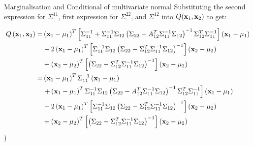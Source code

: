 \documentclass{beamer}
\begin{document}
\begin{frame}{Marginalisation and Conditional of multivariate normal}
	Substituting the second expression for $\Sigma^{11}$, first expression for $\Sigma^{22}$, and $\Sigma^{12}$ into $Q(\mathbf{x}_1,\mathbf{x}_2)$ to get:
	
	\begin{gather}
	\begin{aligned}
	Q\left(\mathbf{x}_{1}, \mathbf{x}_{2}\right)=&\left(\mathbf{x}_{1}-\mu_{1}\right)^{T}\left[\Sigma_{11}^{-1}+\Sigma_{11}^{-1} \Sigma_{12}\left(\Sigma_{22}-A_{12}^{T} \Sigma_{11}^{-1} \Sigma_{12}\right)^{-1} \Sigma_{12}^{T} \Sigma_{11}^{-1}\right]\left(\mathbf{x}_{1}-\mu_{1}\right) \\
	&-2\left(\mathbf{x}_{1}-\mu_{1}\right)^{T}\left[\Sigma_{11}^{-1} \Sigma_{12}\left(\Sigma_{22}-\Sigma_{12}^{T} \Sigma_{11}^{-1} \Sigma_{12}\right)^{-1}\right]\left(\mathbf{x}_{2}-\mu_{2}\right) \\
	&+\left(\mathbf{x}_{2}-\mu_{2}\right)^{T}\left[\left(\Sigma_{22}-\Sigma_{12}^{T} \Sigma_{11}^{-1} \Sigma_{12}\right)^{-1}\right]\left(\mathbf{x}_{2}-\mu_{2}\right)\\
	=&\left(\mathbf{x}_{1}-\mu_{1}\right)^{T} \Sigma_{11}^{-1}\left(\mathbf{x}_{1}-\mu_{1}\right) \\
	&\left.+\left(\mathbf{x}_{1}-\mu_{1}\right)^{T} \Sigma_{11}^{-1} \Sigma_{12}\left(\Sigma_{22}-A_{12}^{T} \Sigma_{11}^{-1} \Sigma_{12}\right)^{-1} \Sigma_{12}^{T} \Sigma_{11}^{-1}\right]\left(\mathbf{x}_{1}-\mu_{1}\right) \\
	&-2\left(\mathbf{x}_{1}-\mu_{1}\right)^{T}\left[\Sigma_{11}^{-1} \Sigma_{12}\left(\Sigma_{22}-\Sigma_{12}^{T} \Sigma_{11}^{-1} \Sigma_{12}\right)^{-1}\right]\left(\mathbf{x}_{2}-\mu_{2}\right) \\
	&+\left(\mathbf{x}_{2}-\mu_{2}\right)^{T}\left[\left(\Sigma_{22}-\Sigma_{12}^{T} \Sigma_{11}^{-1} \Sigma_{12}\right)^{-1}\right]\left(\mathbf{x}_{2}-\mu_{2}\right)
	\end{aligned}\\
	\end{gather})
\end{frame}
\end{document}
